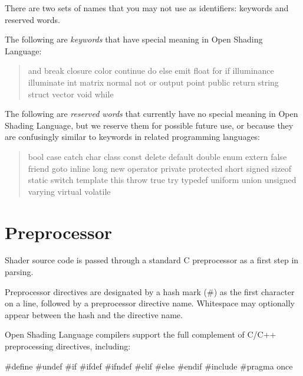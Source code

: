 \documentclass[11pt,letterpaper]{book}
\def\langname{Open Shading Language\xspace}
\begin{document}
There are two sets of names that you may not use as identifiers:
keywords and reserved words.

The following are \emph{keywords} that have special meaning in
\langname: 

\begin{quote} {\cf

and break closure color continue do else emit float for if illuminance
illuminate int matrix normal not or output point public return string struct
vector void while

}
\end{quote}

The following are \emph{reserved words} that currently have no special
meaning in \langname, but we reserve them for possible future use, or
because they are confusingly similar to keywords in related programming
languages: 

\begin{quote} {\cf

bool case catch char class const delete default double 
enum extern false friend
goto inline long new operator private protected 
short signed sizeof static 
switch template this throw true try typedef 
uniform union unsigned varying virtual volatile

}
\end{quote}


\section{Preprocessor}
\label{sec:preprocessor}
 

Shader source code is passed through a standard C preprocessor as a
first step in parsing.  

Preprocessor directives are designated by a hash mark ({\cf \#}) as the
first character on a line, followed by a preprocessor directive name.
Whitespace may optionally appear between the hash and the directive
name.

\langname compilers support the full complement of C/C++ preprocessing
directives, including:

\begin{code}
    #define
    #undef
    #if
    #ifdef
    #ifndef
    #elif
    #else
    #endif
    #include
    #pragma once
\end{code}
\end{document}
